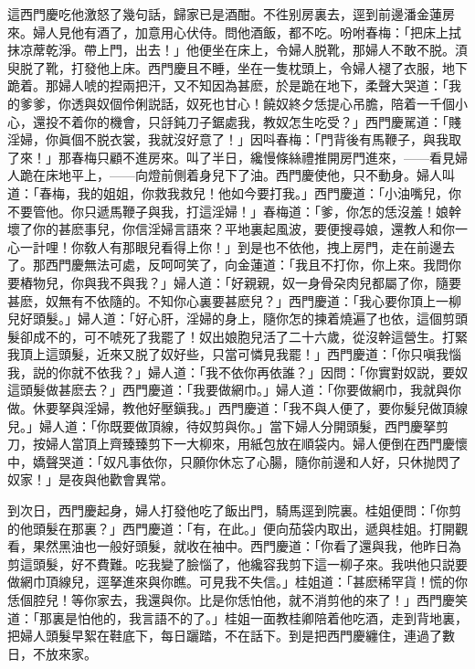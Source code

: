 這西門慶吃他激怒了幾句話，歸家已是酒酣。不徃别房裏去，逕到前邊潘金蓮房來。婦人見他有酒了，加意用心伏侍。問他酒飯，都不吃。吩咐春梅：「把床上拭抹凉蓆乾淨。帶上門，出去！」他便坐在床上，令婦人脱靴，那婦人不敢不脱。湏臾脱了靴，打發他上床。西門慶且不睡，坐在一隻枕頭上，令婦人褪了衣服，地下跪着。那婦人唬的揑兩把汗，又不知因為甚麽，於是跪在地下，柔聲大哭道：「我的爹爹，你透與奴個伶俐説話，奴死也甘心！饒奴終夕恁提心吊膽，陪着一千個小心，還投不着你的機會，只㧱鈍刀子鋸處我，教奴怎生吃受？」西門慶駡道：「賤淫婦，你眞個不脱衣裳，我就沒好意了！」因呌春梅：「門背後有馬鞭子，與我取了來！」那春梅只顧不進房來。叫了半日，纔慢條絲禮推開房門進來，——看見婦人跪在床地平上，——向燈前側着身兒下了油。西門慶使他，只不動身。婦人叫道：「春梅，我的姐姐，你救我救兒！他如今要打我。」西門慶道：「小油嘴兒，你不要管他。你只遞馬鞭子與我，打這淫婦！」春梅道：「爹，你怎的恁沒羞！娘幹壞了你的甚麽事兒，你信淫婦言語來？平地裏起風波，要便搜尋娘，還教人和你一心一計哩！你敎人有那眼兒看得上你！」到是也不依他，拽上房門，走在前邊去了。那西門慶無法可處，反呵呵笑了，向金蓮道：「我且不打你，你上來。我問你要樁物兒，你與我不與我？」婦人道：「好親親，奴一身骨朶肉兒都屬了你，隨要甚麽，奴無有不依隨的。不知你心裏要甚麽兒？」西門慶道：「我心要你頂上一柳兒好頭髮。」婦人道：「好心肝，淫婦的身上，隨你怎的揀着燒遍了也依，這個剪頭髮卻成不的，可不唬死了我罷了！奴出娘胞兒活了二十六歲，從沒幹這營生。打緊我頂上這頭髮，近來又脱了奴好些，只當可憐見我罷！」西門慶道：「你只嗔我惱我，説的你就不依我？」婦人道：「我不依你再依誰？」因問：「你實對奴説，要奴這頭髮做甚麽去？」西門慶道：「我要做網巾。」婦人道：「你要做網巾，我就與你做。休要拏與淫婦，教他好壓鎭我。」西門慶道：「我不與人便了，要你髮兒做頂線兒。」婦人道：「你既要做頂線，待奴剪與你。」當下婦人分開頭髮，西門慶拏剪刀，按婦人當頂上齊臻臻剪下一大柳來，用紙包放在順袋内。婦人便倒在西門慶懷中，嬌聲哭道：「奴凡事依你，只願你休忘了心腸，隨你前邊和人好，只休抛閃了奴家！」是夜與他歡會異常。

到次日，西門慶起身，婦人打發他吃了飯出門，騎馬逕到院裏。桂姐便問：「你剪的他頭髮在那裏？」西門慶道：「有，在此。」便向茄袋内取出，遞與桂姐。打開觀看，果然黑油也一般好頭髮，就收在袖中。西門慶道：「你看了還與我，他昨日為剪這頭髮，好不費難。吃我變了臉惱了，他纔容我剪下這一柳子來。我哄他只説要做網巾頂線兒，逕拏進來與你瞧。可見我不失信。」桂姐道：「甚麽稀罕貨！慌的你恁個腔兒！等你家去，我還與你。比是你恁怕他，就不消剪他的來了！」西門慶笑道：「那裏是怕他的，我言語不的了。」桂姐一面教桂卿陪着他吃酒，走到背地裏，把婦人頭髮早絮在鞋底下，每日躧踏，不在話下。到是把西門慶纏住，連過了數日，不放來家。

